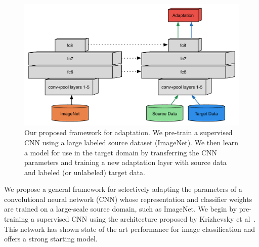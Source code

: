 \newcommand{\svmT}{\bm{\theta}}
\newcommand{\svmB}{b}
\newcommand{\svmAug}{\tilde{\svmT}}
\newcommand{\svmAugAll}{\bm{\Theta}}


\begin{figure}
\begin{center}
\includegraphics[width=.6\linewidth]{figs/model-adapt}
\end{center}
\caption{Our proposed framework for adaptation. We pre-train a supervised CNN using a large labeled source dataset (ImageNet). We then learn a model for use in the target domain by transferring the CNN parameters and training a new adaptation layer with source data and labeled (or unlabeled) target data.}
\label{fig:model-adapt}
\end{figure}


We propose a general framework for selectively adapting the parameters of a
convolutional neural network (CNN) whose representation and classifier weights
are trained on a large-scale source domain, such as ImageNet. 
We begin by pre-training a supervised CNN using the architecture proposed by 
Krizhevsky et al~\cite{supervision}. This network has shown state of the art
performance for image classification and offers a strong starting model.

